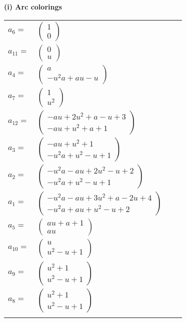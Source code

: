 \documentclass[1p]{elsarticle_modified}
\theoremstyle{definition}
\begin{document}
\flushleft \textbf{(i) Arc colorings}\\
\begin{tabular}{m{7pt} m{180pt} m{7pt} m{180pt} }
\flushright $a_{6}=$&$\begin{pmatrix}1\\0\end{pmatrix}$ \\
\flushright $a_{11}=$&$\begin{pmatrix}0\\u\end{pmatrix}$ \\
\flushright $a_{4}=$&$\begin{pmatrix}a\\- u^2 a+a u- u\end{pmatrix}$ \\
\flushright $a_{7}=$&$\begin{pmatrix}1\\u^2\end{pmatrix}$ \\
\flushright $a_{12}=$&$\begin{pmatrix}- a u+2 u^2+a- u+3\\- a u+u^2+a+1\end{pmatrix}$ \\
\flushright $a_{3}=$&$\begin{pmatrix}- a u+u^2+1\\- u^2 a+u^2- u+1\end{pmatrix}$ \\
\flushright $a_{2}=$&$\begin{pmatrix}- u^2 a- a u+2 u^2- u+2\\- u^2 a+u^2- u+1\end{pmatrix}$ \\
\flushright $a_{1}=$&$\begin{pmatrix}- u^2 a- a u+3 u^2+a-2 u+4\\- u^2 a+a u+u^2- u+2\end{pmatrix}$ \\
\flushright $a_{5}=$&$\begin{pmatrix}a u+a+1\\a u\end{pmatrix}$ \\
\flushright $a_{10}=$&$\begin{pmatrix}u\\u^2- u+1\end{pmatrix}$ \\
\flushright $a_{9}=$&$\begin{pmatrix}u^2+1\\u^2- u+1\end{pmatrix}$ \\
\flushright $a_{8}=$&$\begin{pmatrix}u^2+1\\u^2- u+1\end{pmatrix}$\\&\end{tabular}
\end{document}
